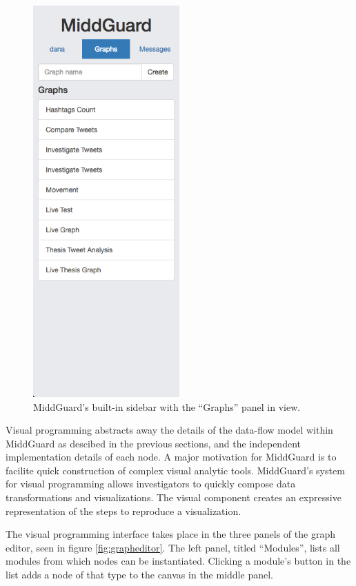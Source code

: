 \documentclass[midd]{thesis}
\begin{document}
\begin{figure}[!ht]
  \centering
  \includegraphics[width=0.5\textwidth]{sidebar-graphs-panel}
  \caption{MiddGuard's built-in sidebar with the ``Graphs'' panel in view.}
  \label{fig:sidebar}
\end{figure}

Visual programming abstracts away the details of the data-flow model within
MiddGuard as descibed in the previous sections, and the independent
implementation details of each node. A major motivation for MiddGuard is to
facilite quick construction of complex visual analytic tools. MiddGuard's system
for visual programming allows investigators to quickly compose data
transformations and visualizations. The visual component creates an expressive
representation of the steps to reproduce a visualization.

The visual programming interface takes place in the three panels of the graph
editor, seen in figure \ref{fig:grapheditor}. The left panel, titled
``Modules'', lists all modules from which nodes can be instantiated. Clicking a
module's button in the list adds a node of that type to the canvas in the middle
panel.
\end{document}
